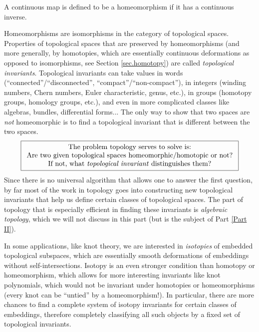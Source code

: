 \begin{defn}[Homeomorphism]
A continuous map is defined to be a homeomorphism if it has a continuous inverse.
\end{defn}

Homeomorphisms are isomorphisms in the category of topological spaces. Properties of topological spaces that are preserved by homeomorphisms (and more generally, by homotopies, which are essentially continuous deformations as opposed to isomorphisms, see Section \ref{sec.homotopy}) are called \emph{topological invariants}. Topological invariants can take values in words (``connected''/``disconnected'', ``compact''/``non-compact''), in integers (winding numbers, Chern numbers, Euler characteristic, genus, etc.), in groups (homotopy groups, homology groups, etc.), and even in more complicated classes like algebras, bundles, differential forms... The only way to show that two spaces are \emph{not} homeomorphic is to find a topological invariant that is different between the two spaces.
\begin{gather*}
\boxed{\begin{array}{c}
\text{The problem topology serves to solve is:}\\
\text{Are two given topological spaces homeomorphic/homotopic or not?}\\
\text{If not, what \emph{topological invariant} distinguishes them?}
\end{array}}
\end{gather*}
Since there is no universal algorithm that allows one to answer the first question, by far most of the work in topology goes into constructing new topological invariants that help us define certain classes of topological spaces. The part of topology that is especially efficient in finding these invariants is \emph{algebraic topology}, which we will not discuss in this part (but is the subject of Part \ref{Part II}).

\begin{rem}
In some applications, like knot theory, we are interested in \emph{isotopies} of embedded topological subspaces, which are essentially smooth deformations of embeddings without self-intersections. Isotopy is an even stronger condition than homotopy or homeomorphism, which allows for more interesting invariants like knot polynomials, which would not be invariant under homotopies or homeomorphisms (every knot can be ``untied'' by a homeomorphism!). In particular, there are more chances to find a complete system of isotopy invariants for certain classes of embeddings, therefore completely classifying all such objects by a fixed set of topological invariants.
\end{rem}


